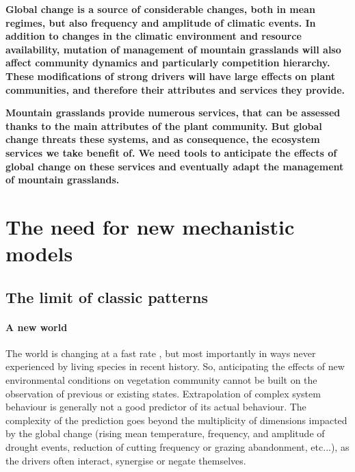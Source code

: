 \textbf{ Global change is a source of considerable changes, both in mean regimes, but also frequency and amplitude of climatic events. In addition to changes in the climatic environment and resource availability, mutation of management of mountain grasslands will also affect community dynamics and particularly competition hierarchy. These modifications of strong drivers will have large effects on plant communities, and therefore their attributes and services they provide.}

\textbf{Mountain grasslands provide numerous services, that can be assessed thanks to the main attributes of the plant community. But global change threats these systems, and as consequence, the ecosystem services we take benefit of. We need tools to anticipate the effects of global change on these services and eventually adapt the management of mountain grasslands.}
%
%



 
%
\section{The need for new mechanistic models}


\subsection{The limit of classic patterns}
\paragraph{A new world}

The world is changing at a fast rate \parencite{butchart_global_2010, intergovernmental_panel_on_climate_change_climate_2014}, but most importantly in ways never experienced by living species in recent history. So, anticipating the effects of new environmental conditions on vegetation community cannot be built on the observation of previous or existing states. Extrapolation of complex system behaviour is generally not a good predictor of its actual behaviour. The complexity of the prediction goes beyond the multiplicity of dimensions impacted by the global change (rising mean temperature, frequency, and amplitude of drought events, reduction of cutting frequency or grazing abandonment, etc...), as the drivers often interact, synergise or negate themselves. 

